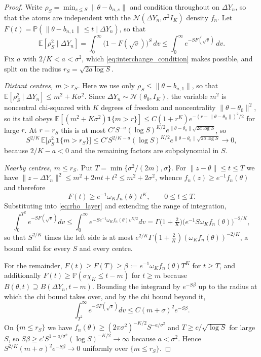 \documentclass[11pt]{article}
\theoremstyle{definition}
\newcommand{\E}{\mathbb{E}}
\newcommand{\Pp}{\mathbb{P}}
\newcommand{\Normal}{\mathcal{N}}
\newcommand{\thetao}{\theta_0}
\begin{document}
\begin{proof}
Write $\rho_S=\min_{s\le S}\lVert\theta-b_{n,s}\rVert$ and condition throughout on $\Delta Y_n$, so that the atoms are independent with the $\Normal(\Delta Y_n,\sigma^2I_K)$ density $f_n$. Let $F(t)=\Pp(\lVert\theta-b_{n,1}\rVert\le t\mid\Delta Y_n)$, so that
\begin{equation}\label{eq:rho_layer}
\E[\rho_S^2\mid\Delta Y_n]=\int_0^\infty\bigl(1-F(\sqrt v)\bigr)^S\,dv
\le\int_0^\infty e^{-SF(\sqrt v)}\,dv .
\end{equation}
Fix $a$ with $2/K<a<\sigma^2$, which \eqref{eq:interchange_condition} makes possible, and split on the radius $r_S=\sqrt{2a\log S}$.

\emph{Distant centres, $m>r_S$.} Here we use only $\rho_S\le\lVert\theta-b_{n,1}\rVert$, so that $\E[\rho_S^2\mid\Delta Y_n]\le m^2+K\sigma^2$. Since $\Delta Y_n\sim\Normal(\thetao,I_K)$, the variable $m^2$ is noncentral chi-squared with $K$ degrees of freedom and noncentrality $\lVert\theta-\thetao\rVert^2$, so its tail obeys $\E[(m^2+K\sigma^2)\mathbf{1}\{m>r\}]\le C(1+r^K)e^{-(r-\lVert\theta-\thetao\rVert)^2/2}$ for large $r$. At $r=r_S$ this is at most $C'S^{-a}(\log S)^{K/2}e^{\lVert\theta-\thetao\rVert\sqrt{2a\log S}}$, so
\[
S^{2/K}\,\E\bigl[\rho_S^2\,\mathbf{1}\{m>r_S\}\bigr]
\le C'S^{2/K-a}(\log S)^{K/2}e^{\lVert\theta-\thetao\rVert\sqrt{2a\log S}}
\longrightarrow0,
\]
because $2/K-a<0$ and the remaining factors are subpolynomial in $S$.

\emph{Nearby centres, $m\le r_S$.} Put $T=\min\{\sigma^2/(2m),\sigma\}$. For $\lVert z-\theta\rVert\le t\le T$ we have $\lVert z-\Delta Y_n\rVert^2\le m^2+2mt+t^2\le m^2+2\sigma^2$, whence $f_n(z)\ge e^{-1}f_n(\theta)$ and therefore
\[
F(t)\ge e^{-1}\omega_Kf_n(\theta)\,t^K,\qquad 0\le t\le T .
\]
Substituting into \eqref{eq:rho_layer} and extending the range of integration,
\begin{equation}\label{eq:local_domination}
\int_0^{T^2}e^{-SF(\sqrt v)}dv
\le\int_0^\infty e^{-Se^{-1}\omega_Kf_n(\theta)v^{K/2}}dv
=\Gamma\bigl(1+\tfrac2K\bigr)\bigl(e^{-1}S\omega_Kf_n(\theta)\bigr)^{-2/K},
\end{equation}
so that $S^{2/K}$ times the left side is at most $e^{2/K}\Gamma(1+\tfrac2K)(\omega_Kf_n(\theta))^{-2/K}$, a bound valid for every $S$ and every centre.

For the remainder, $F(t)\ge F(T)\ge\beta:=e^{-1}\omega_Kf_n(\theta)T^K$ for $t\ge T$, and additionally $F(t)\ge\Pp(\sigma\chi_K\le t-m)$ for $t\ge m$ because $B(\theta,t)\supseteq B(\Delta Y_n,t-m)$. Bounding the integrand by $e^{-S\beta}$ up to the radius at which the chi bound takes over, and by the chi bound beyond it,
\[
\int_{T^2}^\infty e^{-SF(\sqrt v)}dv\le C(m+\sigma)^2e^{-S\beta} .
\]
On $\{m\le r_S\}$ we have $f_n(\theta)\ge(2\pi\sigma^2)^{-K/2}S^{-a/\sigma^2}$ and $T\ge c/\sqrt{\log S}$ for large $S$, so $S\beta\ge c'S^{1-a/\sigma^2}(\log S)^{-K/2}\to\infty$ because $a<\sigma^2$. Hence $S^{2/K}(m+\sigma)^2e^{-S\beta}\to0$ uniformly over $\{m\le r_S\}$.


\end{proof}
\end{document}
